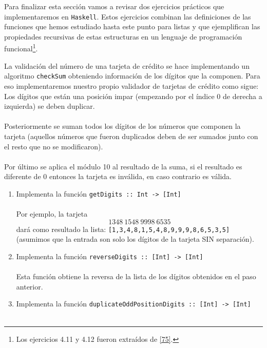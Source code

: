     Para finalizar esta sección vamos a revisar dos ejercicios prácticos que implementaremos en \texttt{Haskell}. Estos ejercicios combinan las definiciones de las funciones que hemos estudiado hasta este punto para listas y que ejemplifican las propiedades recursivas de estas estructuras en un lenguaje de programación funcional\footnote{Los ejercicios 4.11 y 4.12 fueron extraídos de \hyperlink{75}{[75]}.}.


    \begin{exercise}
        La validación del número de una tarjeta de crédito se hace implementando un algoritmo \texttt{checkSum} obteniendo información de los dígitos que la componen. Para eso implementaremos nuestro propio validador de tarjetas de crédito como sigue:\\
    
        Los dígitos que están una posición impar (empezando por el índice 0 de derecha a izquierda) se deben duplicar. \\\\
        Posteriormente se suman todos los dígitos de los números que componen la tarjeta (aquellos números que fueron duplicados deben de ser sumados junto con el resto que no se modificaron).\\\\
        Por último se aplica el módulo 10 al resultado de la suma, si el resultado es diferente de 0 entonces la tarjeta es inválida, en caso contrario es válida.\\
        \begin{enumerate} 
           \item  Implementa la función {\tt getDigits :: Int ->\ [Int]} \\\\
                  Por ejemplo, la tarjeta \[1348\ 1548\ 9998\ 6535\] dará como resultado la lista: \texttt{[1,3,4,8,1,5,4,8,9,9,9,8,6,5,3,5]} \\
                  (asumimos que la entrada son solo los dígitos de la tarjeta SIN separación).\\
           \item  Implementa la función \texttt{reverseDigits ::  [Int] ->\ [Int]} \\\\
                  Esta función obtiene la reversa de la lista de los dígitos obtenidos en el paso anterior.\\
           \item  Implementa la función \texttt{duplicateOddPositionDigits ::  [Int] ->\ [Int]} \\\\

\end{enumerate}
\end{exercise}
